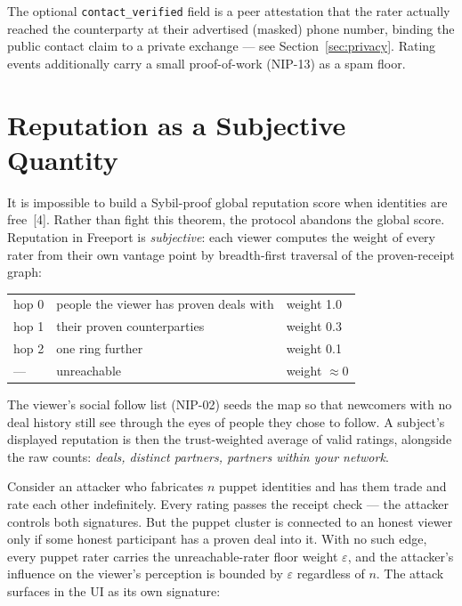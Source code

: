 \documentclass[11pt]{article}
\begin{document}
The optional \texttt{contact\_verified} field is a peer attestation that the
rater actually reached the counterparty at their advertised (masked) phone
number, binding the public contact claim to a private exchange --- see
Section~\ref{sec:privacy}. Rating events additionally carry a small
proof-of-work (NIP-13) as a spam floor.

\section{Reputation as a Subjective Quantity}
\label{sec:subjective}

It is impossible to build a Sybil-proof global reputation score when
identities are free~[4]. Rather than fight this theorem, the protocol
abandons the global score. Reputation in Freeport is \emph{subjective}: each
viewer computes the weight of every rater from their own vantage point by
breadth-first traversal of the proven-receipt graph:

\begin{center}
\begin{tabular}{lll}
\toprule
hop 0 & people the viewer has proven deals with & weight 1.0 \\
hop 1 & their proven counterparties             & weight 0.3 \\
hop 2 & one ring further                        & weight 0.1 \\
---   & unreachable                             & weight $\approx 0$ \\
\bottomrule
\end{tabular}
\end{center}

The viewer's social follow list (NIP-02) seeds the map so that newcomers
with no deal history still see through the eyes of people they chose to
follow. A subject's displayed reputation is then the trust-weighted average
of valid ratings, alongside the raw counts: \emph{deals, distinct partners,
partners within your network}.

Consider an attacker who fabricates $n$ puppet identities and has them trade
and rate each other indefinitely. Every rating passes the receipt check ---
the attacker controls both signatures. But the puppet cluster is connected
to an honest viewer only if some honest participant has a proven deal into
it. With no such edge, every puppet rater carries the unreachable-rater
floor weight $\varepsilon$, and the attacker's influence on the viewer's
perception is bounded by $\varepsilon$ regardless of $n$. The attack
surfaces in the UI as its own signature:
\end{document}
